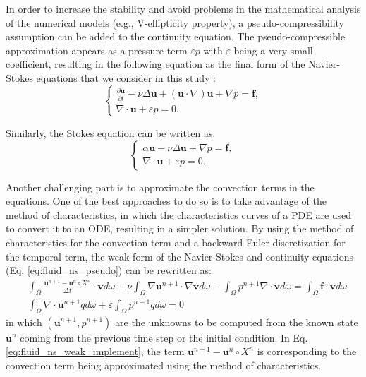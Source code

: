 In order to increase the stability and avoid problems in the mathematical analysis of the numerical models (e.g., V-ellipticity
property), a pseudo-compressibility assumption can be added to the continuity equation. The pseudo-compressible approximation appears as a pressure term $\varepsilon p$ with $\varepsilon$ being a very small coefficient, resulting in the following equation as the final form of the Navier-Stokes equations that we consider in this study \cite{devuyst2013}:
\begin{equation}  \label{eq:fluid_ns_pseudo}
\left\{ {\begin{array}{*{20}{l}}
\displaystyle  {\frac{{\partial {\mathbf{u}}}}{{\partial t}} - \nu\Delta{\mathbf{u}} + \left( {{\mathbf{u}} \cdot \nabla } \right) {\mathbf{u}} + \nabla p = {\mathbf{f}},} \\
 \displaystyle {\nabla\cdot{\mathbf{u}} + \varepsilon p = 0.}
\end{array}} \right.
\end{equation}

Similarly, the Stokes equation can be written as:
\begin{equation} \label{eq:fluid_stokes_pseudo}
\left\{ {\begin{array}{*{20}{l}}
\displaystyle  {\alpha \mathbf{u} - \nu\Delta \mathbf{u} + \nabla p = \mathbf{f},} \\
\displaystyle  {\nabla\cdot\mathbf{u} + \varepsilon p = 0.}
\end{array}} \right.
\end{equation}


Another challenging part is to approximate the convection terms in the equations. One of the best approaches to do so is to take advantage of the method of characteristics, in which the characteristics curves of a \gls{PDE} are used to convert it to an \gls{ODE}, resulting in a simpler solution. By using the method of characteristics for the convection term and a backward Euler discretization for the temporal term, the weak form of the Navier-Stokes and continuity equations (Eq. \ref{eq:fluid_ns_pseudo}) can be rewritten as:
\begin{equation} \label{eq:fluid_ns_weak_implement}
\begin{aligned}
&\int_{\Omega} \frac{\mathbf{u}^{n+1}-\mathbf{u}^{n} \circ X^{n}}{\Delta t} \cdot \mathbf{v} d \omega+\nu \int_{\Omega} \nabla \mathbf{u}^{n+1} \cdot \nabla \mathbf{v} d \omega-\int_{\Omega} p^{n+1} \nabla \cdot \mathbf{v} d \omega=\int_{\Omega} \mathbf{f} \cdot \mathbf{v} d\omega \\
&\int_{\Omega} \nabla \cdot \mathbf{u}^{n+1} q d \omega+\varepsilon \int_{\Omega} p^{n+1} q d \omega=0
\end{aligned}
\end{equation}
in which $(\mathbf{u}^{n+1},p^{n+1})$ are the unknowns to be computed from the known state $\mathbf{u}^{n}$ coming from the previous time step or the initial condition. In Eq. \ref{eq:fluid_ns_weak_implement}, the term $\mathbf{u}^{n+1}-\mathbf{u}^{n} \circ X^{n}$ is corresponding to the convection term being approximated using the method of characteristics.

